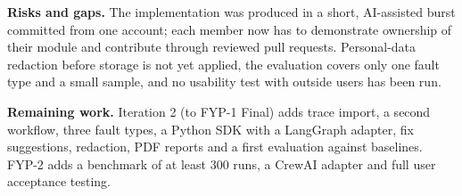 \textbf{Risks and gaps.} The implementation was produced in a short, AI-assisted burst committed from one account; each member now has to demonstrate ownership of their module and contribute through reviewed pull requests. Personal-data redaction before storage is not yet applied, the evaluation covers only one fault type and a small sample, and no usability test with outside users has been run.

\textbf{Remaining work.} Iteration 2 (to FYP-1 Final) adds trace import, a second workflow, three fault types, a Python SDK with a LangGraph adapter, fix suggestions, redaction, PDF reports and a first evaluation against baselines. FYP-2 adds a benchmark of at least 300 runs, a CrewAI adapter and full user acceptance testing.
